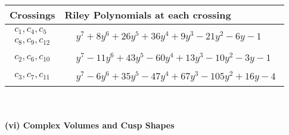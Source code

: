 \documentclass[1p]{elsarticle_modified}
\theoremstyle{definition}
\begin{document}
\begin{tabular}{m{50pt}|m{274pt}}
Crossings & \hspace{64pt}Riley Polynomials at each crossing \\
\hline $$\begin{aligned}c_{1},c_{4},c_{5}\\c_{8},c_{9},c_{12}\end{aligned}$$&$\begin{aligned}
&y^7+8 y^6+26 y^5+36 y^4+9 y^3-21 y^2-6 y-1
\end{aligned}$\\
\hline $$\begin{aligned}c_{2},c_{6},c_{10}\end{aligned}$$&$\begin{aligned}
&y^7-11 y^6+43 y^5-60 y^4+13 y^3-10 y^2-3 y-1
\end{aligned}$\\
\hline $$\begin{aligned}c_{3},c_{7},c_{11}\end{aligned}$$&$\begin{aligned}
&y^7-6 y^6+35 y^5-47 y^4+67 y^3-105 y^2+16 y-4
\end{aligned}$\\
\hline
\end{tabular}\\~\\
\newpage\flushleft \textbf{(vi) Complex Volumes and Cusp Shapes}
\end{document}
